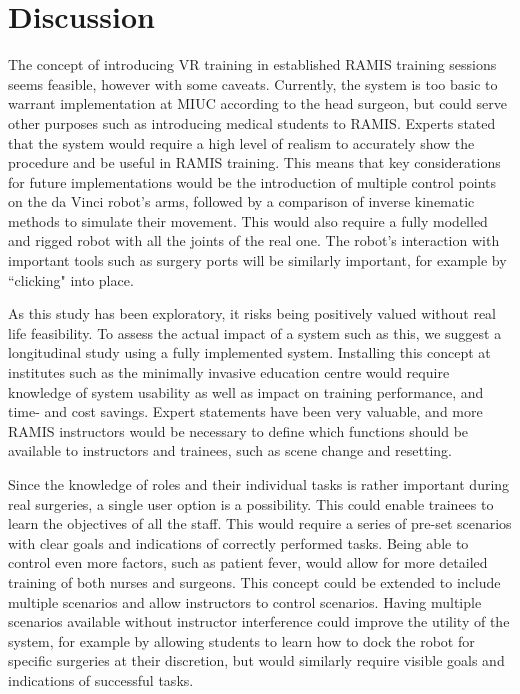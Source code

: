 \section{Discussion}

The concept of introducing VR training in established RAMIS training sessions seems feasible, however with some caveats. Currently, the system is too basic to warrant implementation at MIUC according to the head surgeon, but could serve other purposes such as introducing medical students to RAMIS. Experts stated that the system would require a high level of realism to accurately show the procedure and be useful in RAMIS training. This means that key considerations for future implementations would be the introduction of multiple control points on the da Vinci robot's arms, followed by a comparison of inverse kinematic methods to simulate their movement. This would also require a fully modelled and rigged robot with all the joints of the real one. The robot's interaction with important tools such as surgery ports will be similarly important, for example by ``clicking" into place. 

As this study has been exploratory, it risks being positively valued without real life feasibility. To assess the actual impact of a system such as this, we suggest a longitudinal study using a fully implemented system. Installing this concept at institutes such as the minimally invasive education centre would require knowledge of system usability as well as impact on training performance, and time- and cost savings. Expert statements have been very valuable, and more RAMIS instructors would be necessary to define which functions should be available to instructors and trainees, such as scene change and resetting. 

Since the knowledge of roles and their individual tasks is rather important during real surgeries, a single user option is a possibility. This could enable trainees to learn the objectives of all the staff. This would require a series of pre-set scenarios with clear goals and indications of correctly performed tasks. Being able to control even more factors, such as patient fever, would allow for more detailed training of both nurses and surgeons. This concept could be extended to include multiple scenarios and allow instructors to control scenarios. Having multiple scenarios available without instructor interference could improve the utility of the system, for example by allowing students to learn how to dock the robot for specific surgeries at their discretion, but would similarly require visible goals and indications of successful tasks.

